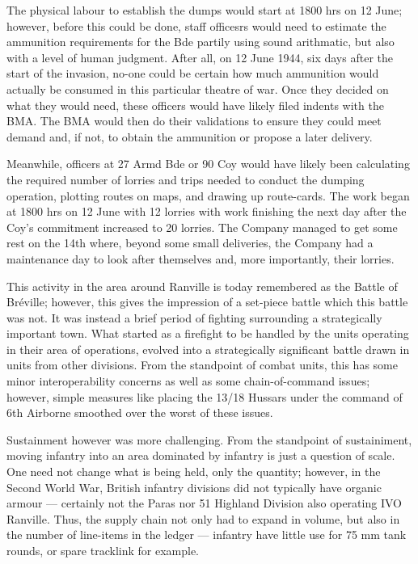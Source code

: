 \documentclass[noraggedright]{turabian-researchpaper}
\begin{document}
The physical labour to establish the dumps would start at 1800 hrs on 12 
June; however, before this could be done, staff officesrs would need to 
estimate the ammunition requirements for the Bde partily using sound 
arithmatic, but also with a level of human judgment.  After all, on 12 June 
1944, six days after the start of the invasion, no-one could be certain how 
much ammunition would actually be consumed in this particular theatre of 
war.  Once they decided on what they would need, these officers would have 
likely filed indents with the BMA.  %
The BMA would then do their validations to ensure they could meet demand and,
if not, to obtain the ammunition or propose a later delivery.

Meanwhile, officers at 27 Armd Bde or 90 Coy would have likely been 
calculating the required number of lorries and trips needed to conduct
the dumping operation, plotting routes on maps, and drawing up 
route-cards.\autocite [12 June 1944] {90wd}  The work began at 1800 hrs
on 12 June with 12 lorries with work finishing the next day after the 
Coy's commitment increased to 20 lorries.%
The Company managed to get some 
rest on the 14th where, beyond some small deliveries, the Company had a 
maintenance day to look after themselves and, more importantly, their 
lorries.\autocite[14 June 1944]{90wd} 


This activity in the area around Ranville is today remembered as the Battle 
of Bréville; however, this gives the impression of a set-piece battle which 
this battle was not.  It was instead a brief period of fighting 
surrounding a strategically important town.  What 
started as a firefight to be handled by the units operating in their area of 
operations, evolved into a strategically significant battle drawn in units 
from other divisions.  From the standpoint of combat units, this has 
some minor interoperability concerns as well as some chain-of-command issues; 
however, simple measures like placing the 13/18 Hussars under the command of 
6th Airborne smoothed over the worst of these issues.  %

Sustainment however was more challenging.  From the standpoint of sustainiment,
moving infantry into an area dominated by infantry is just a question of scale.
One need not change what is being held, only the quantity; however, 
in the Second World War, British infantry divisions did not typically have organic 
armour --- certainly not the Paras nor 51 Highland Division also operating 
IVO Ranville.  Thus, the supply chain not only had to expand in volume, but also
in the number of line-items in the ledger --- infantry have little use for 75 mm
tank rounds, or spare tracklink for example. 
\end{document}
